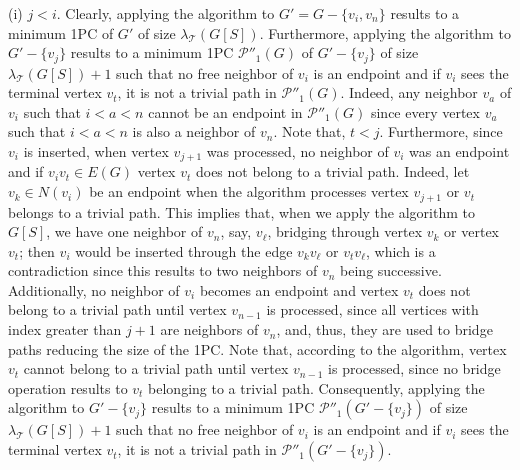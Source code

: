 \documentclass[10pt]{article}
\begin{document}
{(i) $j<i$. Clearly, applying the algorithm to $G'=G-\{v_i,v_n\}$
results to a minimum 1PC of $G'$ of size
$\lambda_\mathcal{T}(G[S])$. Furthermore, applying the algorithm
to $G'-\{v_j\}$ results to a minimum 1PC $\mathcal{P''}_1(G)$ of
$G'-\{v_j\}$ of size $\lambda_\mathcal{T}(G[S])+1$ such that no
free neighbor of $v_i$ is an endpoint and if $v_i$ sees the
terminal vertex $v_t$, it is not a trivial path in
$\mathcal{P''}_1(G)$. Indeed, any neighbor $v_a$ of $v_i$ such
that $i<a<n$ cannot be an endpoint in $\mathcal{P''}_1(G)$ since
every vertex $v_a$ such that $i<a<n$ is also a neighbor of $v_n$.
Note that, $t<j$. Furthermore, since $v_i$ is inserted, when
vertex $v_{j+1}$ was processed, no neighbor of $v_i$ was an
endpoint and if $v_iv_t \in E(G)$ vertex $v_t$ does not belong to
a trivial path. Indeed, let $v_k \in N(v_i)$ be an endpoint when
the algorithm processes vertex $v_{j+1}$ or $v_t$ belongs to a
trivial path. This implies that, when we apply the algorithm to
$G[S]$, we have one neighbor of $v_n$, say, $v_\ell$, bridging
through vertex $v_k$ or vertex $v_t$; then $v_i$ would be inserted
through the edge $v_kv_\ell$ or $v_tv_\ell$, which is a
contradiction since this results to two neighbors of $v_n$ being
successive. Additionally, no neighbor of $v_i$ becomes an endpoint
and vertex $v_t$ does not belong to a trivial path until vertex
$v_{n-1}$ is processed, since all vertices with index greater than
$j+1$ are neighbors of $v_n$, and, thus, they are used to bridge
paths reducing the size of the 1PC. Note that, according to the
algorithm, vertex $v_t$ cannot belong to a trivial path until
vertex $v_{n-1}$ is processed, since no bridge operation results
to $v_t$ belonging to a trivial path. Consequently, applying the
algorithm to $G'-\{v_j\}$ results to a minimum 1PC
$\mathcal{P''}_1(G'-\{v_j\})$ of size
$\lambda_\mathcal{T}(G[S])+1$ such that no free neighbor of $v_i$
is an endpoint and if $v_i$ sees the terminal vertex $v_t$, it is
not a trivial path in $\mathcal{P''}_1(G'-\{v_j\})$.

}
\end{document}
